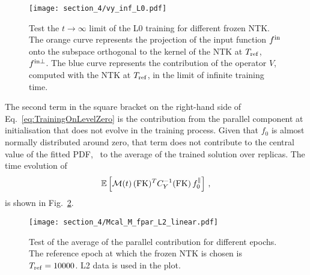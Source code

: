 \begin{figure}[t]
  \centering
  \texttt{[image: section\_4/vy\_inf\_L0.pdf]}  
  \caption{Test the $t\to\infty$ limit of the L0 training for different frozen
  NTK. The orange curve represents the projection of the input function $f^{\rm in}$
  onto the subspace orthogonal to the kernel of the NTK at $T_{\rm ref}$, \ie\
  $f^{\rm in \perp}$. The blue curve represents the contribution of the operator $V$,
  computed with the NTK at $T_{\rm ref}$, in the limit of infinite training
  time.}
  \label{fig:InfiniteTimeVterm}
\end{figure}

The second term in the square bracket on the right-hand side of
Eq.~\eqref{eq:TrainingOnLevelZero} is the contribution from the parallel
component at initialisation that does not evolve in the training process. Given
that $f_0$ is almost normally distributed around zero, that term does not
contribute to the central value of the fitted PDF, \ie\ to the average of the
trained solution over replicas. The time evolution of 
\begin{align}
  \label{eq:AverageLevelZeroUcheck}
  \mathbb{E}\left[\mathcal{M}(t)\, (\mathrm{FK})^T C_{Y}^{-1} (\mathrm{FK})\, 
    f_{0}^\parallel\right]\, ,
\end{align}
is shown in Fig.~\ref{fig:AverageLevelZeroUcheck}.
\begin{figure}[h!]
  \centering
  \texttt{[image: section\_4/Mcal\_M\_fpar\_L2\_linear.pdf]} 
  \caption{Test of the average of the parallel contribution for different
  epochs. The reference epoch at which the frozen NTK is chosen is $T_{\rm ref}
  = 10000$. L2 data is used in the plot.}
  \label{fig:AverageLevelZeroUcheck}
\end{figure}

